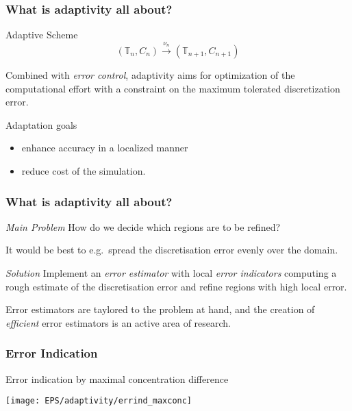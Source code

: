 \begin{frame}
  \frametitle<presentation>{What is adaptivity all about?}

  Adaptive Scheme
  \[
  (\mathbb{T}_n,C_{n}) \stackrel{\nu_n}{\rightarrow} (\mathbb{T}_{n+1},C_{n+1})
  \]

  Combined with \emph{error control}, adaptivity aims for optimization of the computational effort with a constraint on the maximum tolerated discretization error.

  \begin{block}{Adaptation goals}
    \begin{itemize}
      \item enhance accuracy in a localized manner
      \item reduce cost of the simulation.
    \end{itemize}
  \end{block}
\end{frame}

\begin{frame}
  \frametitle<presentation>{What is adaptivity all about?}
  \begin{block}{\emph{Main Problem}}
    How do we decide which regions are to be refined?

    It would be best to e.g.~spread the discretisation error evenly over the domain.
  \end{block}

  \pause
  \begin{block}{\emph{Solution}}
    Implement an \emph{\emph{error estimator}} with local \emph{\emph{error indicators}} computing a rough estimate of the discretisation error and refine regions with high local error.
  \end{block}

  Error estimators are taylored to the problem at hand, and the creation of \emph{efficient} error estimators is an active area of research.
\end{frame}

\begin{frame}[fragile]
  \frametitle<presentation>{Error Indication}

  \begin{center}
    \begin{minipage}{0.75\textwidth}
      \begin{center}
        Error indication by maximal concentration difference

        \texttt{[image: EPS/adaptivity/errind\_maxconc]}
      \end{center}
    \end{minipage}
  \end{center}
\end{frame}


